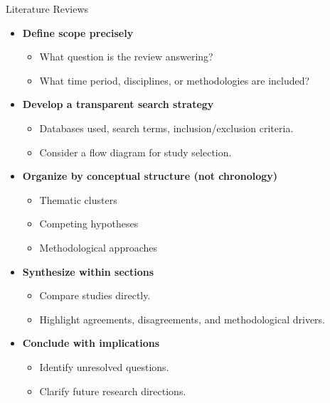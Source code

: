 \documentclass{beamer}
\begin{document}
\begin{frame}{Literature Reviews}
\fontsize{9pt}{10pt}\selectfont
    
\begin{itemize}
    \item \textbf{Define scope precisely}
    \begin{itemize}
        \item What question is the review answering?
        \item What time period, disciplines, or methodologies are included?
    \end{itemize}
    \item \textbf{Develop a transparent search strategy}
    \begin{itemize}
        \item Databases used, search terms, inclusion/exclusion criteria.
        \item Consider a flow diagram for study selection.
    \end{itemize}
    \item \textbf{Organize by conceptual structure (not chronology)}
    \begin{itemize}
        \item Thematic clusters
        \item Competing hypotheses
        \item Methodological approaches
    \end{itemize}
    \item \textbf{Synthesize within sections}
    \begin{itemize}
        \item Compare studies directly.
        \item Highlight agreements, disagreements, and methodological drivers.
    \end{itemize}
    \item \textbf{Conclude with implications}
    \begin{itemize}
        \item Identify unresolved questions.
        \item Clarify future research directions.
    \end{itemize}
\end{itemize}

\end{frame}
\end{document}
